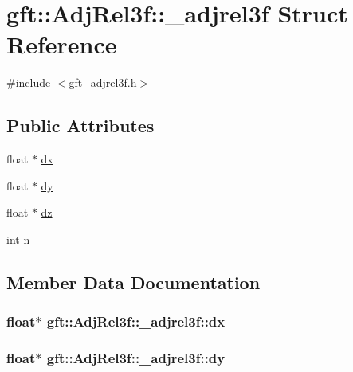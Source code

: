 \hypertarget{structgft_1_1AdjRel3f_1_1__adjrel3f}{}\section{gft\+:\+:Adj\+Rel3f\+:\+:\+\_\+adjrel3f Struct Reference}
\label{structgft_1_1AdjRel3f_1_1__adjrel3f}


{\ttfamily \#include $<$gft\+\_\+adjrel3f.\+h$>$}

\subsection*{Public Attributes}
\begin{DoxyCompactItemize}
\item 
float $\ast$ \hyperlink{structgft_1_1AdjRel3f_1_1__adjrel3f_a01376a362ee6239ec87f0698a0bbdbaf}{dx}
\item 
float $\ast$ \hyperlink{structgft_1_1AdjRel3f_1_1__adjrel3f_a218f31b93e97d95f354d7e20ab005802}{dy}
\item 
float $\ast$ \hyperlink{structgft_1_1AdjRel3f_1_1__adjrel3f_a9f5466eaebc904592f473a52da0f9127}{dz}
\item 
int \hyperlink{structgft_1_1AdjRel3f_1_1__adjrel3f_af1b74ab4843c76ffb8aef6ebcd06b086}{n}
\end{DoxyCompactItemize}


\subsection{Member Data Documentation}
\subsubsection[{\texorpdfstring{dx}{dx}}]{\setlength{\rightskip}{0pt plus 5cm}float$\ast$ gft\+::\+Adj\+Rel3f\+::\+\_\+adjrel3f\+::dx}\hypertarget{structgft_1_1AdjRel3f_1_1__adjrel3f_a01376a362ee6239ec87f0698a0bbdbaf}{}\label{structgft_1_1AdjRel3f_1_1__adjrel3f_a01376a362ee6239ec87f0698a0bbdbaf}
\subsubsection[{\texorpdfstring{dy}{dy}}]{\setlength{\rightskip}{0pt plus 5cm}float$\ast$ gft\+::\+Adj\+Rel3f\+::\+\_\+adjrel3f\+::dy}\hypertarget{structgft_1_1AdjRel3f_1_1__adjrel3f_a218f31b93e97d95f354d7e20ab005802}{}\label{structgft_1_1AdjRel3f_1_1__adjrel3f_a218f31b93e97d95f354d7e20ab005802}
